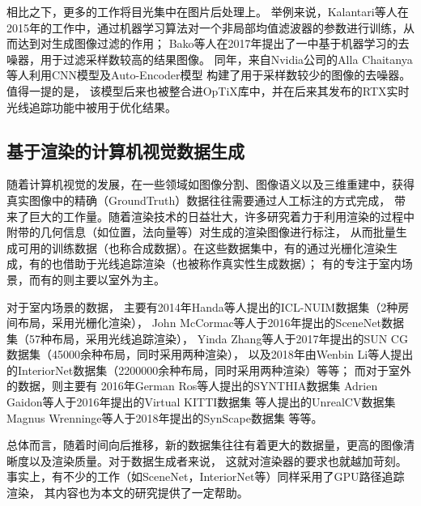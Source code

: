 相比之下，更多的工作将目光集中在图片后处理上。
举例来说，Kalantari等人在2015年的工作中\cite{MachingLearning1}，通过机器学习算法对一个非局部均值滤波器的参数进行训练，从而达到对生成图像过滤的作用；
Bako等人在2017年提出了一中基于机器学习的去噪器\cite{MachingLearningDenoiser}，用于过滤采样数较高的结果图像。
同年，来自Nvidia公司的Alla Chaitanya等人利用CNN模型及Auto-Encoder模型
构建了用于采样数较少的图像的去噪器\cite{NvidiaDenoiser}。值得一提的是，
该模型后来也被整合进OpTiX库中，并在后来其发布的RTX实时光线追踪功能中被用于优化结果\cite{RTXDenoiser}。

\subsection{基于渲染的计算机视觉数据生成}

随着计算机视觉的发展，在一些领域如图像分割、图像语义以及三维重建中，获得真实图像中的精确（GroundTruth）数据往往需要通过人工标注的方式完成，
带来了巨大的工作量。随着渲染技术的日益壮大，许多研究着力于利用渲染的过程中附带的几何信息（如位置，法向量等）对生成的渲染图像进行标注，
从而批量生成可用的训练数据（也称合成数据）。在这些数据集中，有的通过光栅化渲染生成，有的也借助于光线追踪渲染（也被称作真实性生成数据）；
有的专注于室内场景，而有的则主要以室外为主。

对于室内场景的数据，
主要有2014年Handa等人提出的ICL-NUIM数据集\cite{ICLNUIM}（2种房间布局，采用光栅化渲染），
John McCormac等人于2016年提出的SceneNet数据集\cite{SceneNet}（57种布局，采用光线追踪渲染），
Yinda Zhang等人于2017年提出的SUN CG数据集\cite{SUNCG}（45000余种布局，同时采用两种渲染），
以及2018年由Wenbin Li等人提出的InteriorNet数据集\cite{InteriorNet}（2200000余种布局，同时采用两种渲染）等等；
而对于室外的数据，则主要有
2016年German Ros等人提出的SYNTHIA数据集%
Adrien Gaidon等人于2016年提出的Virtual KITTI数据集%
等人提出的UnrealCV数据集%
Magnus Wrenninge等人于2018年提出的SynScape数据集%
等等。

总体而言，随着时间向后推移，新的数据集往往有着更大的数据量，更高的图像清晰度以及渲染质量。对于数据生成者来说，
这就对渲染器的要求也就越加苛刻。事实上，有不少的工作（如SceneNet，InteriorNet等）同样采用了GPU路径追踪渲染，
其内容也为本文的研究提供了一定帮助。